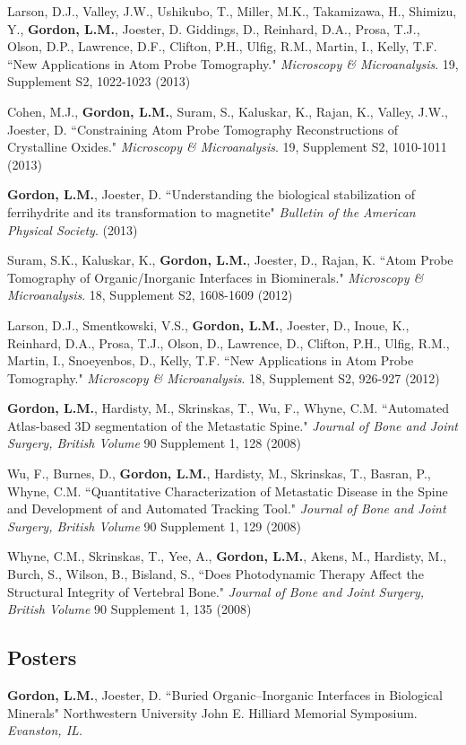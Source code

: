 Larson, D.J., Valley, J.W., Ushikubo, T., Miller, M.K., Takamizawa, H., Shimizu, Y., \textbf{Gordon, L.M.}, Joester, D. Giddings, D., Reinhard, D.A., Prosa, T.J., Olson, D.P., Lawrence, D.F., Clifton, P.H., Ulfig, R.M., Martin, I., Kelly, T.F. ``New Applications in Atom Probe Tomography." \emph{Microscopy \& Microanalysis}. 19, Supplement S2, 1022-1023 (2013)

Cohen, M.J., \textbf{Gordon, L.M.}, Suram, S., Kaluskar, K., Rajan, K., Valley, J.W., Joester, D. ``Constraining Atom Probe Tomography Reconstructions of Crystalline Oxides." \emph{Microscopy \& Microanalysis}. 19, Supplement S2, 1010-1011 (2013)

\textbf{Gordon, L.M.}, Joester, D. ``Understanding the biological stabilization of ferrihydrite and its transformation to magnetite" \emph{Bulletin of the American Physical Society}. (2013)

Suram, S.K., Kaluskar, K., \textbf{Gordon, L.M.}, Joester, D., Rajan, K. ``Atom Probe Tomography of Organic/Inorganic Interfaces in Biominerals." \emph{Microscopy \& Microanalysis}. 18, Supplement S2, 1608-1609 (2012)

Larson, D.J., Smentkowski, V.S., \textbf{Gordon, L.M.}, Joester, D., Inoue, K.,  Reinhard, D.A., Prosa, T.J., Olson, D., Lawrence, D., Clifton, P.H., Ulfig, R.M., Martin, I., Snoeyenbos, D., Kelly, T.F. ``New Applications in Atom Probe Tomography." \emph{Microscopy \& Microanalysis}. 18, Supplement S2, 926-927 (2012)

\textbf{Gordon, L.M.}, Hardisty, M., Skrinskas, T., Wu, F., Whyne, C.M. ``Automated Atlas-based 3D segmentation of the Metastatic Spine." \emph{Journal of Bone and Joint Surgery, British Volume} 90 Supplement 1, 128 (2008)

Wu, F., Burnes, D., \textbf{Gordon, L.M.}, Hardisty, M., Skrinskas, T., Basran, P., Whyne, C.M. ``Quantitative Characterization of Metastatic Disease in the Spine and Development of and Automated Tracking Tool." \emph{Journal of Bone and Joint Surgery, British Volume} 90 Supplement 1, 129 (2008)

Whyne, C.M., Skrinskas, T., Yee, A., \textbf{Gordon, L.M.}, Akens, M., Hardisty, M., Burch, S., Wilson, B., Bisland, S., ``Does Photodynamic Therapy Affect the Structural Integrity of Vertebral Bone." \emph{Journal of Bone and Joint Surgery, British Volume} 90 Supplement 1, 135 (2008)

\subsection*{Posters}
\textbf{Gordon, L.M.}, Joester, D. ``Buried Organic--Inorganic Interfaces in Biological Minerals" Northwestern University John E. Hilliard Memorial Symposium. \emph{Evanston, IL.}

